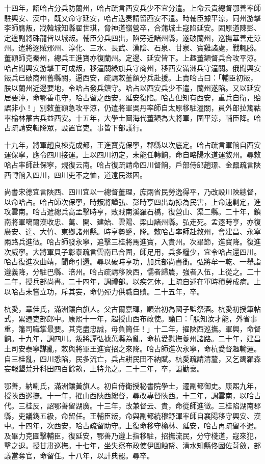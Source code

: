 \begin{pinyinscope}
十四年，詔哈占分兵防蘭州，哈占疏言西安兵少不宜分遣。上命云貴總督鄂善率師駐興安、漢中，既又命守延安，哈占迭奏請留西安不遣。時輔臣據平涼，同州游擊李師膺叛，戕韓城知縣翟世琪，脅神道嶺營卒，合蒲城土寇陷延安。固原道陳彭、定邊副將硃龍皆以城叛。輔臣分兵四出，陷旁近諸州縣，遂破蘭州，巡撫華善走涼州。遣將逐賊邠州、淳化、三水、長武、漢陰、石泉、甘泉、寶雞諸處，戰輒勝。董額師克秦州，總兵王進寶亦復蘭州。定邊、延安皆下。上趣董額督兵合攻平涼。哈占聞興安游擊王可成叛，移潼關綠旗兵守商州，移西安滿洲兵守潼關。俄聞興安叛兵已破商州舊縣關，逼西安，疏請敕董額分兵赴援。上責哈占曰：「輔臣初叛，朕以蘭州近邊要地，令哈占發兵鎮守。哈占以西安兵少不遣，蘭州遂陷。又以延安居要沖，命鄂善屯守，哈占留之西安，延安復陷。哈占但知有西安，重兵自衛，貽誤非小！」別敕董額急攻平涼，仍遣將軍吳丹率師自太原移駐潼關，員外郎拉篤祜率榆林蒙古兵益西安。十五年，大學士圖海代董額為大將軍，圍平涼，輔臣降。哈占疏請安輯降眾，設置官吏。事皆下部議行。

十九年，將軍趙良棟克成都，王進寶克保寧，郡縣以次底定。哈占疏言軍餉自西安運保寧，應令四川接運。上以四川初定，未能任轉餉，命自略陽水道運敘州。尋敕哈占率師赴保寧，規復云南。哈占復疏請命四川督餉，戶部侍郎趙璟、金鼐疏言陜西轉餉入四川，四川吏不之恤，道遠民滋困。

尚書宋德宜言陜西、四川宜以一總督董理，庶兩省民勞逸得平，乃改設川陜總督，以命哈占。哈占師次保寧，時叛將譚弘、彭時亨四出劫掠為民害，上命速剿定，進攻雲南。哈占遣總兵高孟擊時亨，敗賊南溪羅石橋，復營山、渠二縣。二十年，鎮南將軍噶爾漢收忠、萬、開、建始、雲陽、梁山諸州縣。弘走死。孟逐時亨，亦復廣安、達、大竹、東鄉諸州縣。時亨勢蹙，降。敕哈占率師赴敘州，會建昌、永寧兩路兵進徵。哈占師發永寧，追擊三桂將馬進寶，入貴州。次畢節，進寶降。復進次威寧。大將軍貝子彰泰疏言雲南已合圍，師足用，兵多糧少，宜令哈占還四川。哈占復進次曲靖，聞命引還。尋以破時亨功，加兵部尚書銜。弘將牟一乾、一舉詣遵義降，分駐巴縣、涪州。哈占疏請移陜西，懦者歸農，強者入伍，上從之。二十二年，授兵部尚書。二十四年，調禮部。以疾乞休，上疏自述在軍時積勞成病。上以哈占未嘗立功，斥其妄，命仍殫力供職自贖。二十五年，卒。

杭愛，章佳氏，滿洲鑲白旗人。父古爾嘉琿，順治初為國子監祭酒。杭愛初授筆帖式，累遷吏部郎中。康熙十一年，超授山西布政使。諭曰：「朕知汝才能，外省事重，籓司職掌最要。其克盡忠誠，毋負簡任！」十二年，擢陜西巡撫。軍興，命督餉。十九年，調四川。叛將譚弘據萬縣為亂，命杭愛慰撫夔州諸路。二十年，建昌土司安泰寧謀亂，敕與將軍王進寶招之來降。哈占師進次永寧，命杭愛督趣輸運。自三桂亂，四川悉陷，民多流亡，兵占耕民田不納賦。杭愛疏請清釐，又乞蠲羅森妄報墾荒升科田四百餘畝，上特允之。二十二年，卒，謚勤襄。

鄂善，納喇氏，滿洲鑲黃旗人。初自侍衛授秘書院學士，遷副都御史。康熙九年，授陜西巡撫。十一年，擢山西陜西總督，尋改專督陜西。十二年，調雲南，以哈占代。三桂反，詔鄂善留湖廣。十三年，改兼督云、貴，命從師進徵。三桂陷湖南郡縣，吏議鐫五級，命留任。王輔臣叛，命與副都統穆舒渾率師自襄陽移守興安、漢中。十四年，次西安，哈占疏留助守。上復命移守榆林、延安，哈占再疏留不遣。及畢力克圖擊輔臣，復延安，鄂善乃遵上指移駐，招撫流民，分守棧道，寇來犯，擊之退。授甘肅巡撫。十七年，坐失察布政使伊圖蝕帑、清水知縣佟國佐苛斂，部議當奪官，命留任。十八年，以計典罷。尋卒。


\end{pinyinscope}
